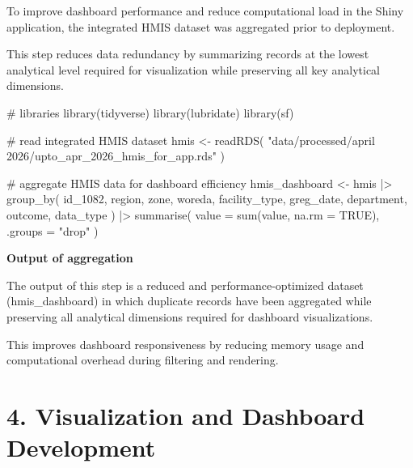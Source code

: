 \documentclass[
  letterpaper,
  DIV=11,
  numbers=noendperiod]{scrartcl}
\newenvironment{Shaded}{\begin{snugshade}}{\end{snugshade}}
\newcommand{\AttributeTok}[1]{\textcolor[rgb]{0.40,0.45,0.13}{#1}}
\newcommand{\CommentTok}[1]{\textcolor[rgb]{0.37,0.37,0.37}{#1}}
\newcommand{\ConstantTok}[1]{\textcolor[rgb]{0.56,0.35,0.01}{#1}}
\newcommand{\FunctionTok}[1]{\textcolor[rgb]{0.28,0.35,0.67}{#1}}
\newcommand{\NormalTok}[1]{\textcolor[rgb]{0.00,0.23,0.31}{#1}}
\newcommand{\OtherTok}[1]{\textcolor[rgb]{0.00,0.23,0.31}{#1}}
\newcommand{\SpecialCharTok}[1]{\textcolor[rgb]{0.37,0.37,0.37}{#1}}
\newcommand{\StringTok}[1]{\textcolor[rgb]{0.13,0.47,0.30}{#1}}
\begin{document}
To improve dashboard performance and reduce computational load in the
Shiny application, the integrated HMIS dataset was aggregated prior to
deployment.

This step reduces data redundancy by summarizing records at the lowest
analytical level required for visualization while preserving all key
analytical dimensions.

\begin{Shaded}
\begin{Highlighting}[]
\CommentTok{\# libraries}
\FunctionTok{library}\NormalTok{(tidyverse)}
\FunctionTok{library}\NormalTok{(lubridate)}
\FunctionTok{library}\NormalTok{(sf)}

\CommentTok{\# read integrated HMIS dataset}
\NormalTok{hmis }\OtherTok{\textless{}{-}} \FunctionTok{readRDS}\NormalTok{(}
  \StringTok{"data/processed/april 2026/upto\_apr\_2026\_hmis\_for\_app.rds"}
\NormalTok{)}

\CommentTok{\# aggregate HMIS data for dashboard efficiency}
\NormalTok{hmis\_dashboard }\OtherTok{\textless{}{-}}\NormalTok{ hmis }\SpecialCharTok{|\textgreater{}}
  \FunctionTok{group\_by}\NormalTok{(}
\NormalTok{    id\_1082,}
\NormalTok{    region,}
\NormalTok{    zone,}
\NormalTok{    woreda,}
\NormalTok{    facility\_type,}
\NormalTok{    greg\_date,}
\NormalTok{    department,}
\NormalTok{    outcome,}
\NormalTok{    data\_type}
\NormalTok{  ) }\SpecialCharTok{|\textgreater{}}
  \FunctionTok{summarise}\NormalTok{(}
    \AttributeTok{value =} \FunctionTok{sum}\NormalTok{(value, }\AttributeTok{na.rm =} \ConstantTok{TRUE}\NormalTok{),}
    \AttributeTok{.groups =} \StringTok{"drop"}
\NormalTok{  )}
\end{Highlighting}
\end{Shaded}

\textbf{Output of aggregation}

The output of this step is a reduced and performance-optimized dataset
(hmis\_dashboard) in which duplicate records have been aggregated while
preserving all analytical dimensions required for dashboard
visualizations.

This improves dashboard responsiveness by reducing memory usage and
computational overhead during filtering and rendering.

\section{4. Visualization and Dashboard
Development}\label{visualization-and-dashboard-development}
\end{document}

